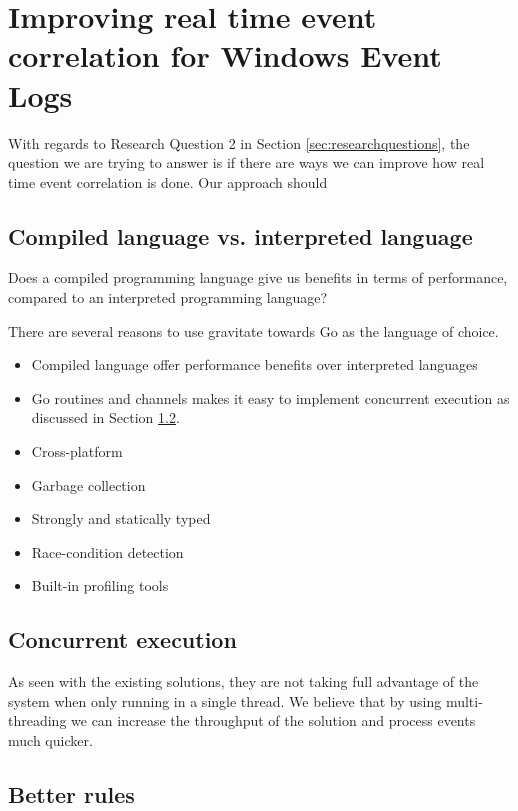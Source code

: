 \section{Improving real time event correlation for Windows Event Logs}
\label{sec:improving-real-time-event-correlation-for-windows-event-logs}

With regards to Research Question 2 in Section \ref{sec:researchquestions}, the question we are trying to answer is if there are ways we can improve how real time event correlation is done. Our approach should 

\subsection{Compiled language vs. interpreted language}
\label{sub:use-compiled-language}

Does a compiled programming language give us benefits in terms of performance, compared to an interpreted programming language?


There are several reasons to use gravitate towards Go as the language of choice.
\begin{itemize}
    \item Compiled language offer performance benefits over interpreted languages
    \item Go routines and channels makes it easy to implement concurrent execution as discussed in Section \ref{sub:concurrent-execution}.
    \item Cross-platform
    \item Garbage collection
    \item Strongly and statically typed
    \item Race-condition detection
    \item Built-in profiling tools
\end{itemize}

\subsection{Concurrent execution}
\label{sub:concurrent-execution}

As seen with the existing solutions, they are not taking full advantage of the system when only running in a single thread. We believe that by using multi-threading we can increase the throughput of the solution and process events much quicker.

\subsection{Better rules}
\label{sub:better-rules}

